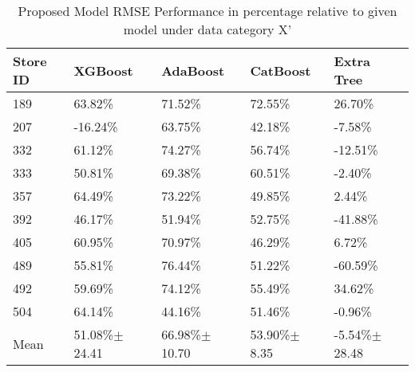 \begin{table*}[]
\centering
\caption{Proposed Model RMSE Performance in percentage relative to given model under data category X'}
\setlength{\tabcolsep}{3pt}
 {\renewcommand{\arraystretch}{1}%
\label{tab:my-table}
\begin{tabular}{p{}p{}p{}p{}p{}}
\hline
\textbf{Store ID} & \textbf{XGBoost}  & \textbf{AdaBoost}  & \textbf{CatBoost}  & \textbf{Extra Tree}  \\ \hline
189        & 63.82\%         & 71.52\%
          & 72.55\%          & 26.70\%           \\
207        & -16.24\%        & 63.75\%
           & 42.18\%          & -7.58\%            \\
332        & 61.12\%        & 74.27\%           & 56.74\%          & -12.51\%           \\
333        & 50.81\%         & 69.38\%             & 60.51\%          & -2.40\%           \\
357        & 64.49\%         & 73.22\%          & 49.85\%          & 2.44\%           \\
392        & 46.17\%         & 51.94\%          & 52.75\%          & -41.88\%          \\
405        & 60.95\%         & 70.97\%          & 46.29\%         & 6.72\%            \\
489        & 55.81\%        & 76.44\%         & 51.22\%          & -60.59\%          \\
492        & 59.69\%         & 74.12\%           & 55.49\%         & 34.62\%             \\
504        & 64.14\%        & 44.16\%          & 51.46\%         & -0.96\%          \\ \hline
Mean           & 51.08\%$\pm$ 24.41    & 66.98\%$\pm$ 10.70     & 53.90\%$\pm$ 8.35     & -5.54\%$\pm$ 28.48      \\ \hline
\end{tabular}%
}
\end{table*}

